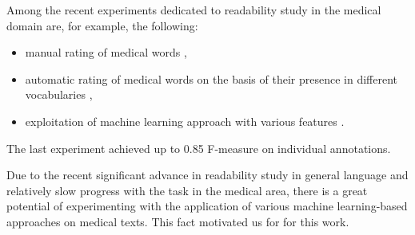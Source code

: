 Among the recent experiments dedicated to readability study in the medical domain are, for example, the following: 
\begin{itemize}
    \item manual rating of medical words \citep{Zheng-AMIA2002},
    \item automatic rating of medical words on the basis of their presence in different vocabularies
    \citep{Borst-MIE2008},
    \item exploitation of machine learning approach
    with various features \citep{Grabar-PITR2014}.
\end{itemize}
The last experiment achieved up to 0.85 F-measure on individual annotations.

Due to the recent significant advance in readability study in general language and relatively slow progress with the task in the medical area, there is a great potential of experimenting with the application of various machine learning-based approaches on medical texts. This fact motivated us for for this work.
